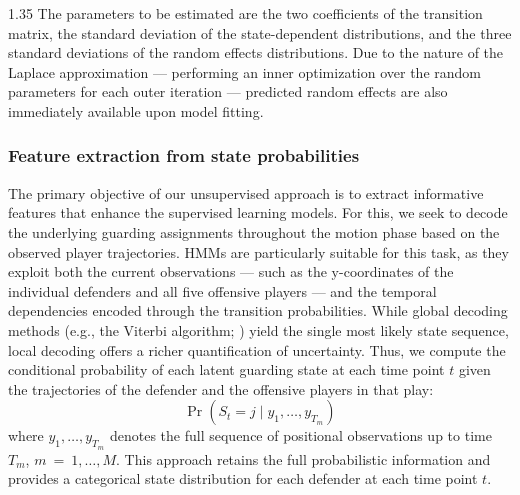 \documentclass[12pt,a4paper]{article}
\begin{document}
\begin{spacing}{1.35}
The parameters to be estimated are the two coefficients of the transition matrix, the standard deviation of the state-dependent distributions, and the three standard deviations of the random effects distributions. Due to the nature of the Laplace approximation --- performing an inner optimization over the random parameters for each outer iteration --- predicted random effects are also immediately available upon model fitting.

\subsubsection{Feature extraction from state probabilities}\label{sec:summary}
The primary objective of our unsupervised approach is to extract informative features that enhance the supervised learning models. For this, we seek to decode the underlying guarding assignments throughout the motion phase based on the observed player trajectories. HMMs are particularly suitable for this task, as they exploit both the current observations --- such as the $\mathrm{y}$-coordinates of the individual defenders and all five offensive players --- and the temporal dependencies encoded through the transition probabilities. %
While global decoding methods (e.g., the Viterbi algorithm; \citealp{zucchini}) yield the single most likely state sequence, local decoding offers a richer quantification of uncertainty.
Thus, we compute the conditional probability of each latent guarding state at each time point $t$ given the trajectories of the defender and the offensive players in that play:
$$ \Pr(S_t = j \mid y_1, \dots, y_{T_m}) $$
where $y_1, \dots, y_{T_m}$ denotes the full sequence of positional observations up to time $T_m$, $m ~=~1, \ldots, M$. This approach retains the full probabilistic information and provides a categorical state distribution for each defender at each time point $t$. %




\end{spacing}
\end{document}
